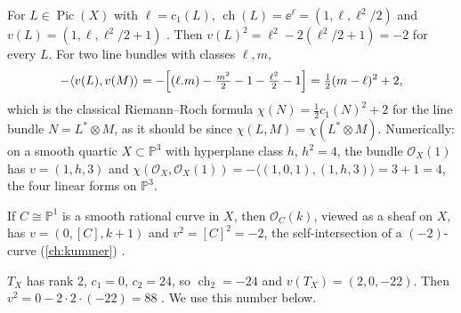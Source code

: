 \begin{example}\label{ex:mukai:line}
For $L\in\operatorname{Pic}(X)$ with $\ell=c_1(L)$, $\operatorname{ch}(L)=\ee^{\ell}=(1,\ell,
\ell^2/2)$ and $v(L)=(1,\ell,\ell^2/2+1)$ . Then
$v(L)^2=\ell^2-2(\ell^2/2+1)=-2$ for every $L$. For two line bundles with classes $\ell,m$,
\[
  -\langle v(L),v(M)\rangle=-\Bigl[(\ell.m)-\tfrac{m^2}{2}-1-\tfrac{\ell^2}{2}-1\Bigr]
  =\tfrac12(m-\ell)^2+2,
\]
which is the classical Riemann--Roch formula $\chi(N)=\frac12c_1(N)^2+2$ for the line bundle
$N=L^*\otimes M$, as it should be since $\chi(L,M)=\chi(L^*\otimes M)$. Numerically: on a smooth
quartic $X\subset\mathbb P^3$ with hyperplane class $h$, $h^2=4$, the bundle $\mathcal O_X(1)$ has
$v=(1,h,3)$ and $\chi(\mathcal O_X,\mathcal O_X(1))=-\langle(1,0,1),(1,h,3)\rangle=3+1=4$, the
four linear forms on $\mathbb P^3$.
\end{example}

\begin{example}\label{ex:mukai:curve}
If $C\cong\mathbb P^1$ is a smooth rational curve in $X$, then $\mathcal O_C(k)$, viewed as a sheaf
on $X$, has $v=(0,[C],k+1)$ and $v^2=[C]^2=-2$, the self-intersection of a $(-2)$-curve
(\cref{ch:kummer}) .
\end{example}

\begin{example}\label{ex:mukai:tangent}
$T_X$ has rank $2$, $c_1=0$, $c_2=24$, so $\operatorname{ch}_2=-24$ and $v(T_X)=(2,0,-22)$.
Then $v^2=0-2\cdot2\cdot(-22)=88$ . We use this number
below.
\end{example}

